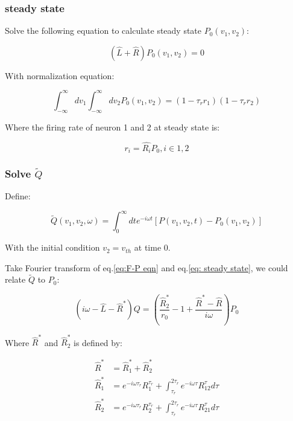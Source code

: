 \documentclass{article}
\begin{document}
	\subsubsection{steady state}
	
	Solve the following equation to calculate steady state $P_0(v_1,v_2)$:
	
	\begin{equation}
		(\hat{L}+\hat{R})P_0(v_1,v_2)=0
		\label{eq: steady state}
	\end{equation}
	
	With normalization equation:
	
	\begin{equation}
		\int_{-\infty}^{\infty}dv_1\int_{-\infty}^{\infty}dv_2P_0(v_1,v_2)=(1-\tau_rr_1)(1-\tau_rr_2)
	\end{equation}
	
	Where the firing rate of neuron 1 and 2 at steady state  is:
	
	\begin{equation}
		r_i=\hat{R_i}P_0, i\in {1,2}
	\end{equation}
	
	\subsubsection{Solve $\tilde{Q}$}
	
	Define:
	
	\begin{equation}
		\tilde{Q}(v_1,v_2,\omega)=\int_0^{\infty}dt e^{-i\omega t}[P(v_1,v_2,t)-P_0(v_1,v_2)]
	\end{equation}
	
	With the initial condition $v_2=v_{th}$ at time 0.
	
	Take Fourier transform of eq.\eqref{eq:F-P eqn} and eq.\eqref{eq: steady state}, we could relate $\tilde{Q}$ to $P_0$:
	
	\begin{equation}
		(i\omega-\hat{L}-\hat{R}^*)Q=(\frac{\hat{R}_2^*}{r_0}-1+\frac{\hat{R}^*-\hat{R}}{i\omega})P_0
		\label{eq: relation between Q an P}
	\end{equation}
	
	Where $\hat{R}^*$ and $\hat{R}_2^{*}$ is defined by:
	
    \begin{align}
    	\hat{R}^*&=\hat{R}_1^*+\hat{R}_2^*\\
    	\hat{R}_1^*&=e^{-i\omega\tau_r}R_1^{\tau_r}+\int_{\tau_r}^{2\tau_r}e^{-i\omega\tau}R_{12}^{\tau}d\tau\\
    	\hat{R}_2^*&=e^{-i\omega\tau_r}R_2^{\tau_r}+\int_{\tau_r}^{2\tau_r}e^{-i\omega\tau}R_{21}^{\tau}d\tau
	\end{align}
	
\end{document}
